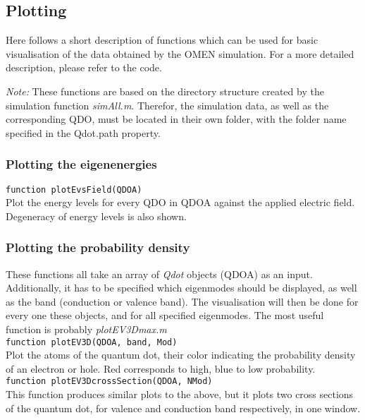 \subsection{Plotting}
Here follows a short description of functions which can be used for basic visualisation of the data obtained by the OMEN simulation. For a more detailed description, please refer to the code.

\textit{Note:} These functions are based on the directory structure created by the simulation function \textit{simAll.m}. Therefor, the simulation data, as well as the corresponding QDO, must be located in their own folder, with the folder name specified in the Qdot.path property.

\subsubsection{Plotting the eigenenergies}
\lstinline{function plotEvsField(QDOA)}\\

Plot the energy levels for every QDO in QDOA against the applied electric field. Degeneracy of energy levels is also shown.

\subsubsection{Plotting the probability density}
These functions all take an array of \textit{Qdot} objects (QDOA) as an input. Additionally, it has to be specified which eigenmodes should be displayed, as well as the band (conduction or valence band). The visualisation will then be done for every one these objects, and for all specified eigenmodes. The most useful function is probably \textit{plotEV3Dmax.m}\\

\lstinline{function plotEV3D(QDOA, band, Mod) }\\

Plot the atoms of the quantum dot, their color indicating the probability density of an electron or hole. Red corresponds to high, blue to low probability.\\

\lstinline{function plotEV3DcrossSection(QDOA, NMod) }\\

This function produces similar plots to the above, but it plots two cross sections of the quantum dot, for valence and conduction band respectively, 
in one window.\\

